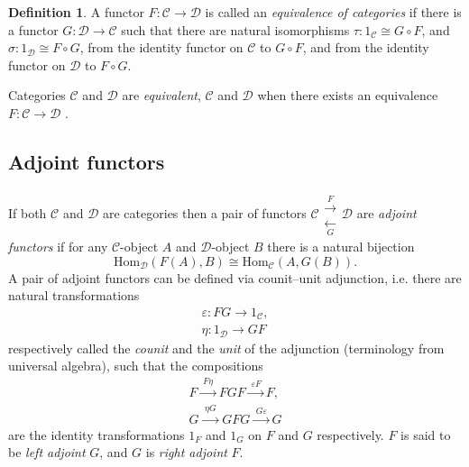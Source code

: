 \documentclass[10]{article}
\theoremstyle{plain}
\theoremstyle{definition}
\theoremstyle{definition}
\newtheorem{definition}[prop]{Definition}
\numberwithin{equation}{section}
\newcommand{\eps}{\varepsilon}                    %
\newcommand{\7}{\dagger}                     %
\newcommand{\8}{\bullet}                     %
\renewcommand{\.}{\cdot}                     %
\renewcommand{\:}{\colon}                    %
\renewcommand{\:}{\colon}           %
\def\ee_#1{e_{{\scriptscriptstyle#1}}}       %
\newcommand{\Hom}{\mathrm{Hom}}       %
\newcommand{\be}{\begin{equation}}
\renewcommand{\ee}{\end{equation}}
\newcommand{\bean}{\begin{eqnarray*}}
\newcommand{\eean}{\end{eqnarray*}}
\begin{document}
\begin{appendices}
			\begin{definition}\label{category_equivalence_definition}\cite{goldblatt:topoi}
				A functor $F: \mathscr C\to  \mathscr D$ is called an \textit{equivalence of categories} if there 
				is a functor $G: \mathscr D\to  \mathscr C$ such that there are natural isomorphisms $\tau : 1_{\mathscr C} \cong G \circ F$, and $\sigma : 1_{\mathscr D} \cong F \circ G$, from the identity functor on ${\mathscr C}$ to $ G \circ F$, and 
				from the identity functor on ${\mathscr D}$ to $ F \circ G$.
				
				Categories $\mathscr C$ and $\mathscr D$ are \textit{equivalent},  $\mathscr C$ and $\mathscr D$ when there exists an equivalence $F: \mathscr C\to  \mathscr D$ .
			\end{definition}
			
			
			
			
			
			
			
			\subsection{Adjoint functors}\label{adjoint_functor_sec}
			\paragraph*{}
			
			If both $\mathscr C$ and $\mathscr D$ are categories then a pair of functors $\mathscr C \substack{ \xrightarrow{F}\\\xleftarrow[G]{}}\mathscr D$ are \textit{adjoint functors} if for any $\mathscr C$-object $A$ and $\mathscr D$-object $B$ there is a natural bijection
			$$
			\Hom_{\mathscr D}\left(F\left(A \right), B  \right) \cong \Hom_{\mathscr C}\left(A, G\left(B \right)  \right).
			$$
			A pair of {adjoint functors} can be defined via counit–unit adjunction, i.e. there are natural transformations
			\bean
			\eps : FG \to 1_{\mathscr C},\\
			\eta : 1_{\mathscr  D} \to  GF 
			\eean
			respectively called the \textit{counit} and the \textit{unit} of the adjunction (terminology from universal algebra), such that the compositions
			\be\label{id_thens_eqn}
			\begin{split}
				F{\xrightarrow {\;F\eta \;}}FGF{\xrightarrow {\;\varepsilon F\,}}F,\\
				G{\xrightarrow {\;\eta G\;}}GFG{\xrightarrow {\;G\varepsilon \,}}G
			\end{split}
			\ee
			are the identity transformations $1_F$ and $1_G$ on $F$ and $G$ respectively. $F$ is said to be \textit{left adjoint} $G$, and $G$ is \textit{right adjoint} $F$.
				
			
						
						
					\end{appendices}
					

		
 
\end{document}
